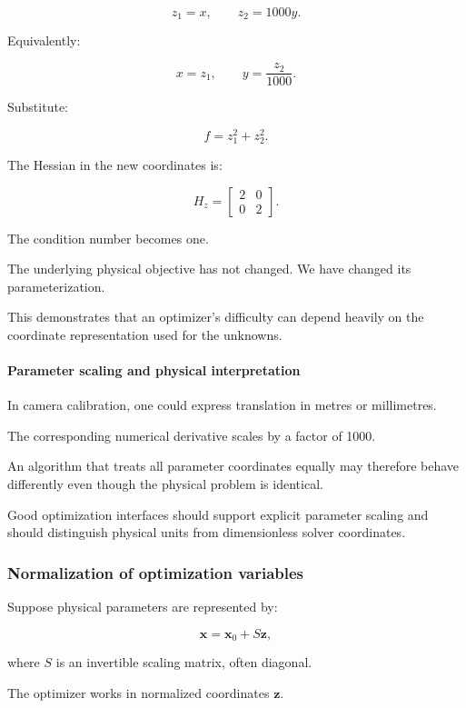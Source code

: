 \[
z_1=x,\qquad z_2=1000y.
\]

Equivalently:

\[
x=z_1,\qquad y=\frac{z_2}{1000}.
\]

Substitute:

\[
f=z_1^2+z_2^2.
\]

The Hessian in the new coordinates is:

\[
H_z= \begin{bmatrix} 2&0\\ 0&2 \end{bmatrix}.
\]

The condition number becomes one.

The underlying physical objective has not changed. We have changed its parameterization.

This demonstrates that an optimizer's difficulty can depend heavily on the coordinate representation used for the unknowns.

\paragraph{Parameter scaling and physical interpretation}\label{02-foundations-ii-ch027-parameter-scaling-and-physical-interpretation}

In camera calibration, one could express translation in metres or millimetres.

The corresponding numerical derivative scales by a factor of 1000.

An algorithm that treats all parameter coordinates equally may therefore behave differently even though the physical problem is identical.

Good optimization interfaces should support explicit parameter scaling and should distinguish physical units from dimensionless solver coordinates.

\subsubsection{Normalization of optimization variables}\label{02-foundations-ii-ch027-normalization-of-optimization-variables}

Suppose physical parameters are represented by:

\[
\mathbf x=\mathbf x_0+S\mathbf z,
\]

where \(S\) is an invertible scaling matrix, often diagonal.

The optimizer works in normalized coordinates \(\mathbf z\).

